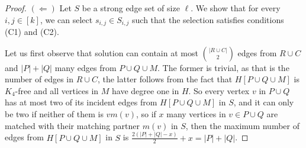 \begin{proof}
$(\Leftarrow)$
Let $S$ be a strong edge set of size $\ell$. We show that for every $i,j\in [k]$, we can select $s_{i,j}\in S_{i,j}$ such that the selection satisfies conditions (C1) and (C2).
 
Let us first observe that solution can contain at most $\binom{|R\cup C|}{2}$ edges from $R\cup C$ and $|P|+|Q|$ many edges from $P\cup Q\cup M$. The former is trivial, as that is the number of edges in $R\cup C$, the latter follows from the fact that $H[P\cup Q\cup M]$ is $K_4$-free and all vertices in $M$ have degree one in $H$. So every vertex $v$ in $P\cup Q$ has at most two of its incident edges from $H[P\cup Q\cup M]$ in $S$, and it can only be two if neither of them is $vm(v)$, so if $x$ many vertices in $v\in P\cup Q$ are matched with their matching partner $m(v)$ in $S$, then the maximum number of edges from $H[P\cup Q\cup M]$ in $S$ is $\frac{2(|P|+|Q|-x)}{2} + x = |P|+|Q|$. 


\end{proof}
